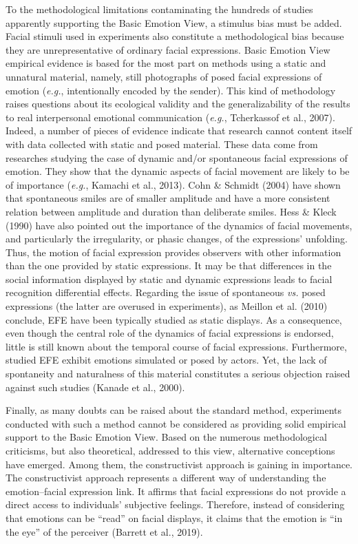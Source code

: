 \documentclass[
  english,
  doc]{apa7}
\begin{document}
To the methodological limitations contaminating the hundreds of studies apparently supporting the Basic Emotion View, a stimulus bias must be added. Facial stimuli used in experiments also constitute a methodological bias because they are unrepresentative of ordinary facial expressions. Basic Emotion View empirical evidence is based for the most part on methods using a static and unnatural material, namely, still photographs of posed facial expressions of emotion (\emph{e.g.}, intentionally encoded by the sender). This kind of methodology raises questions about its ecological validity and the generalizability of the results to real interpersonal emotional communication (\emph{e.g.}, Tcherkassof et al., 2007). Indeed, a number of pieces of evidence indicate that research cannot content itself with data collected with static and posed material. These data come from researches studying the case of dynamic and/or spontaneous facial expressions of emotion. They show that the dynamic aspects of facial movement are likely to be of importance (\emph{e.g.}, Kamachi et al., 2013). Cohn \& Schmidt (2004) have shown that spontaneous smiles are of smaller amplitude and have a more consistent relation between amplitude and duration than deliberate smiles. Hess \& Kleck (1990) have also pointed out the importance of the dynamics of facial movements, and particularly the irregularity, or phasic changes, of the expressions' unfolding. Thus, the motion of facial expression provides observers with other information than the one provided by static expressions. It may be that differences in the social information displayed by static and dynamic expressions leads to facial recognition differential effects. Regarding the issue of spontaneous \emph{vs.} posed expressions (the latter are overused in experiments), as Meillon et al. (2010) conclude, EFE have been typically studied as static displays. As a consequence, even though the central role of the dynamics of facial expressions is endorsed, little is still known about the temporal course of facial expressions. Furthermore, studied EFE exhibit emotions simulated or posed by actors. Yet, the lack of spontaneity and naturalness of this material constitutes a serious objection raised against such studies (Kanade et al., 2000).

Finally, as many doubts can be raised about the standard method, experiments conducted with such a method cannot be considered as providing solid empirical support to the Basic Emotion View. Based on the numerous methodological criticisms, but also theoretical, addressed to this view, alternative conceptions have emerged. Among them, the constructivist approach is gaining in importance. The constructivist approach represents a different way of understanding the emotion--facial expression link. It affirms that facial expressions do not provide a direct access to individuals' subjective feelings. Therefore, instead of considering that emotions can be ``read'' on facial displays, it claims that the emotion is ``in the eye'' of the perceiver (Barrett et al., 2019).
\end{document}
